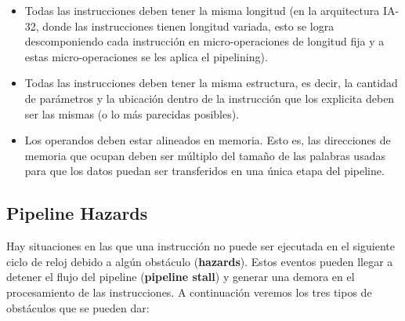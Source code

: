 \begin{itemize}
	\item Todas las instrucciones deben tener la misma longitud (en la arquitectura IA-32, donde las instrucciones tienen longitud variada, esto se logra descomponiendo cada instrucción en micro-operaciones de longitud fija y a estas micro-operaciones se les aplica el pipelining).
	\item Todas las instrucciones deben tener la misma estructura, es decir, la cantidad de parámetros y la ubicación dentro de la instrucción que los explicita deben ser las mismas (o lo más parecidas posibles). 
	\item Los operandos deben estar alineados en memoria. Esto es, las direcciones de memoria que ocupan deben ser múltiplo del tamaño de las palabras usadas para que los datos puedan ser transferidos en una única etapa del pipeline.
\end{itemize}

\subsection{Pipeline Hazards}
Hay situaciones en las que una instrucción no puede ser ejecutada en el siguiente ciclo de reloj debido a algún obstáculo (\textbf{hazards}). Estos eventos pueden llegar a detener el flujo del pipeline (\textbf{pipeline stall}) y generar una demora en el procesamiento de las instrucciones. A continuación veremos los tres tipos de obstáculos que se pueden dar:

